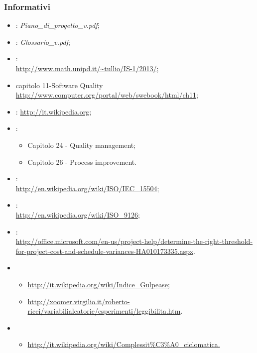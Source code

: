 \subsubsection{Informativi}
\label{1.4.2}
\begin{itemize}
\item {}:  \emph{Piano\_di\_progetto\_v\versionePianoDiProgetto{}.pdf};\\
\item {}: \emph{Glossario\_v\versioneGlossario{}.pdf};\\
\item {}:
\\ \url{http://www.math.unipd.it/~tullio/IS-1/2013/};
\item {} capitolo 11-Software Quality \\ \url{http://www.computer.org/portal/web/swebook/html/ch11};
\item {}: \url{http://it.wikipedia.org};
\item {}:
\begin{itemize}
\item Capitolo 24 - Quality management;
\item Capitolo 26 - Process improvement.
\end{itemize}
\item {}:
\\ \url{http://en.wikipedia.org/wiki/ISO/IEC_15504};
\item {}:
\\ \url{http://en.wikipedia.org/wiki/ISO_9126};
\item {}: \\ \url{http://office.microsoft.com/en-us/project-help/determine-the-right-threshold-for-project-cost-and-schedule-variances-HA010173335.aspx}.
\item {}
\begin{itemize}
\item \url{http://it.wikipedia.org/wiki/Indice_Gulpease};
\item \url{http://xoomer.virgilio.it/roberto-ricci/variabilialeatorie/esperimenti/leggibilita.htm}.
\end{itemize}
\item {}
\begin{itemize}
\item \url{http://it.wikipedia.org/wiki/Complessit%C3%A0_ciclomatica.}
\end{itemize}
\end{itemize}


